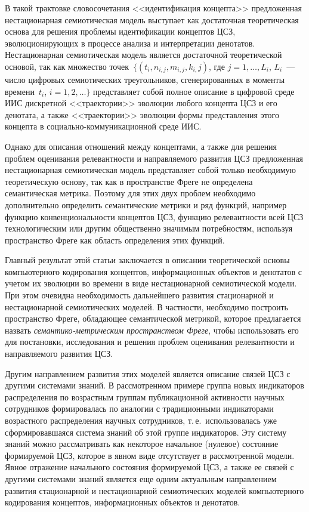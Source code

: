 \begin{multicols}{2}
   В такой трактовке словосочетания <<идентификация концепта>> предложенная 
нестационарная семиотическая модель выступает как достаточная теоре\-тическая основа для 
решения проблемы идентификации концептов ЦСЗ, эволюционирующих в процессе анализа 
и интерпретации денотатов. Нестационарная семиотическая модель является достаточной 
теоретической основой, так как множество точек~$\{(t_i, n_{i,j}, m_{i,j}, k_{i,}j)$, где $j = 1,  
\ldots , L_i$, $L_i$~--- число цифровых семиотических треугольников, сгенерированных в 
моменты времени~$t_i$, $i = 1, 2, \ldots \}$ представляет собой полное описание в цифровой 
среде ИИС дискретной <<траектории>> эволюции любого концепта ЦСЗ и его денотата, а 
также <<траектории>> эволюции формы представления этого концепта в 
   социально-ком\-му\-ни\-ка\-ци\-он\-ной среде ИИС.
   
   Однако для описания отношений между концептами, а также для решения проблем 
оценивания релевантности и направляемого развития ЦСЗ предложенная нестационарная 
семиотическая модель представляет собой только необходимую теоретическую основу, так 
как в пространстве Фреге не определена семантическая метрика. Поэтому для этих двух 
проблем необходимо дополнительно определить семантические метрики и ряд функций, 
например функцию конвенциональности концептов ЦСЗ, функцию релевантности всей ЦСЗ 
технологическим или другим общественно значимым потребностям, используя пространство 
Фреге как область определения этих функций.
   
   Главный результат этой статьи заключается в описании теоретической основы 
компьютерного кодирования концептов, информационных \mbox{объектов} и денотатов с учетом их 
эволюции во времени в виде нестационарной семиотической модели. При этом очевидна 
необходимость дальнейшего развития стационарной и нестационарной семиотических 
моделей. В частности, необходимо построить пространство Фреге, обладающее 
семантической метрикой, которое предлагается назвать \textit{семантико-метрическим 
пространством Фреге}, чтобы использовать его для постановки, исследования и решения 
проблем оценивания релевантности и направляемого развития ЦСЗ.
   
   Другим направлением развития этих моделей является описание связей ЦСЗ с другими 
системами знаний. В рассмотренном примере группа новых индикаторов распределения по 
возрастным группам публикационной активности научных сотрудников формировалась по 
аналогии с традиционными индикаторами возрастного распределения научных сотрудников, 
т.\,е.\ использовалась уже сформировавшаяся система знаний об этой группе индикаторов. 
Эту систему знаний можно рас\-смат\-ри\-вать как некоторое начальное (нулевое) состояние 
формируемой ЦСЗ, которое в явном виде отсутствует в рассмотренной модели. Явное 
отражение начального состояния формируемой ЦСЗ, а также ее связей с другими системами 
знаний является еще одним актуальным направлением развития стационарной и 
нестационарной семиотических моделей компьютерного кодирования концептов, 
информационных объектов и денотатов.


\end{multicols}
